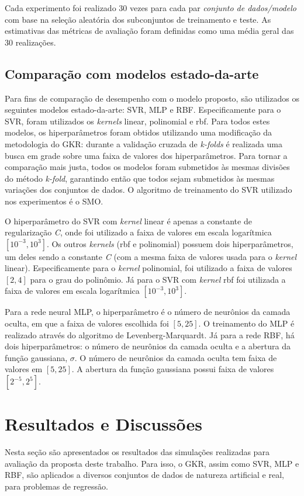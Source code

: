 Cada experimento foi realizado 30 vezes para cada par \textit{conjunto de dados/modelo} com base na seleção aleatória dos subconjuntos de treinamento e teste. As estimativas das métricas de avaliação foram definidas como uma média geral das 30 realizações.

\subsection{Comparação com modelos estado-da-arte}
Para fins de comparação de desempenho com o modelo proposto, são utilizados os seguintes modelos estado-da-arte: SVR, MLP e RBF. Especificamente para o SVR, foram utilizados os \textit{kernels} linear, polinomial e rbf. Para todos estes modelos, os hiperparâmetros foram obtidos utilizando uma modificação da metodologia do GKR: durante a validação cruzada de \textit{k-folds} é realizada uma busca em grade sobre uma faixa de valores dos hiperparâmetros. Para tornar a comparação mais justa, todos os modelos foram submetidos às mesmas divisões do método \textit{k-fold}, garantindo então que todos sejam submetidos às mesmas variações dos conjuntos de dados. O algoritmo de treinamento do SVR utilizado nos experimentos é o SMO.

O hiperparâmetro do SVR com \textit{kernel} linear é apenas a constante de regularização \textit{C}, onde foi utilizado a faixa de valores em escala logarítmica $[10^{-3}, 10^3]$. Os outros \textit{kernels} (rbf e polinomial) possuem dois hiperparâmetros, um deles sendo a constante \textit{C} (com a mesma faixa de valores usada para o \textit{kernel} linear). Especificamente para o \textit{kernel} polinomial, foi utilizado a faixa de valores $[2, 4]$ para o grau do polinômio. Já para o SVR com \textit{kernel} rbf foi utilizada a faixa de valores em escala logarítmica $[10^{-3}, 10^3]$.

Para a rede neural MLP, o hiperparâmetro é o número de neurônios da camada oculta, em que a faixa de valores escolhida foi $[5, 25]$. O treinamento do MLP é realizado através do algoritmo de Levenberg-Marquardt. Já para a rede RBF, há dois hiperparâmetros: o número de neurônios da camada oculta e a abertura da função gaussiana, $\sigma$. O número de neurônios da camada oculta tem faixa de valores em $[5, 25]$. A abertura da função gaussiana possui faixa de valores $[2^{-5}, 2^5]$.

\section{Resultados e Discussões} \label{sec:results}
Nesta seção são apresentados os resultados das simulações realizadas para avaliação da proposta deste trabalho. Para isso, o GKR, assim como SVR, MLP e RBF, são aplicados a diversos conjuntos de dados de natureza artificial e real, para problemas de regressão.

